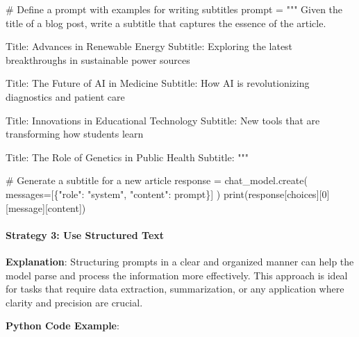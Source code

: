 \documentclass[
]{agujournal2019}
\let\oldparagraph\paragraph
\renewcommand{\paragraph}[1]{\oldparagraph{#1}\mbox{}}
\newenvironment{Shaded}{\begin{snugshade}}{\end{snugshade}}
\newcommand{\BuiltInTok}[1]{\textcolor[rgb]{0.00,0.23,0.31}{#1}}
\newcommand{\CommentTok}[1]{\textcolor[rgb]{0.37,0.37,0.37}{#1}}
\newcommand{\DecValTok}[1]{\textcolor[rgb]{0.68,0.00,0.00}{#1}}
\newcommand{\NormalTok}[1]{\textcolor[rgb]{0.00,0.23,0.31}{#1}}
\newcommand{\OperatorTok}[1]{\textcolor[rgb]{0.37,0.37,0.37}{#1}}
\newcommand{\StringTok}[1]{\textcolor[rgb]{0.13,0.47,0.30}{#1}}
\begin{document}
\begin{Shaded}
\begin{Highlighting}[]
\CommentTok{\# Define a prompt with examples for writing subtitles}
\NormalTok{prompt }\OperatorTok{=} \StringTok{"""}
\StringTok{Given the title of a blog post, write a subtitle that captures the essence of the article.}

\StringTok{Title: Advances in Renewable Energy}
\StringTok{Subtitle: Exploring the latest breakthroughs in sustainable power sources}

\StringTok{Title: The Future of AI in Medicine}
\StringTok{Subtitle: How AI is revolutionizing diagnostics and patient care}

\StringTok{Title: Innovations in Educational Technology}
\StringTok{Subtitle: New tools that are transforming how students learn}

\StringTok{Title: The Role of Genetics in Public Health}
\StringTok{Subtitle: }
\StringTok{"""}

\CommentTok{\# Generate a subtitle for a new article}
\NormalTok{response }\OperatorTok{=}\NormalTok{ chat\_model.create(}
\NormalTok{    messages}\OperatorTok{=}\NormalTok{[\{}\StringTok{"role"}\NormalTok{: }\StringTok{"system"}\NormalTok{, }\StringTok{"content"}\NormalTok{: prompt\}]}
\NormalTok{)}
\BuiltInTok{print}\NormalTok{(response[}\StringTok{\textquotesingle{}choices\textquotesingle{}}\NormalTok{][}\DecValTok{0}\NormalTok{][}\StringTok{\textquotesingle{}message\textquotesingle{}}\NormalTok{][}\StringTok{\textquotesingle{}content\textquotesingle{}}\NormalTok{])}
\end{Highlighting}
\end{Shaded}

\paragraph{Strategy 3: Use Structured
Text}\label{strategy-3-use-structured-text}

\textbf{Explanation}: Structuring prompts in a clear and organized
manner can help the model parse and process the information more
effectively. This approach is ideal for tasks that require data
extraction, summarization, or any application where clarity and
precision are crucial.

\textbf{Python Code Example}:
\end{document}
